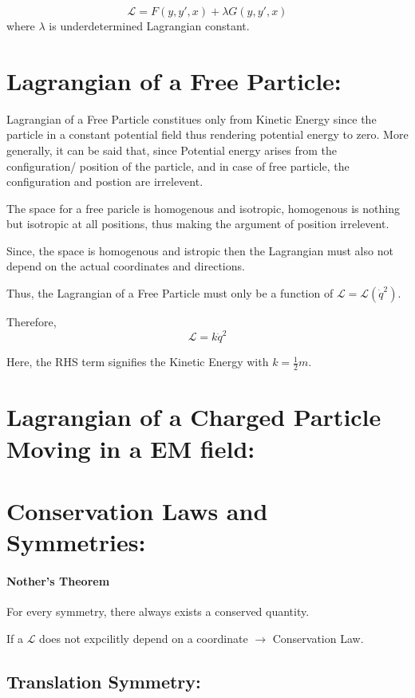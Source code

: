 \documentclass[a4paper]{article}
\newcommand{\Lagr}{\mathcal{L}}
\newcommand{\half}{\frac{1}{2}}
\begin{document}
		$$ \Lagr = F(y, y', x) + \lambda G(y, y', x) $$ where $\lambda$ is underdetermined Lagrangian constant.
	
	\section*{Lagrangian of a Free Particle: }

		Lagrangian of a Free Particle constitues only from Kinetic Energy since the particle in a constant potential field thus rendering potential energy to zero. 
		More generally, it can be said that, since Potential energy arises from the configuration/ position of the particle, and in case of free particle, the configuration and postion are irrelevent.

		The space for a free paricle is homogenous and isotropic, homogenous is nothing but isotropic at all positions, thus making the argument of position irrelevent.

		Since, the space is homogenous and istropic then the Lagrangian must also not depend on the actual coordinates and directions.

		Thus, the Lagrangian of a Free Particle must only be a function of $\Lagr = \Lagr(\dot{q}^2)$.

		Therefore, 
			$$ \Lagr = k \dot{q}^2 $$
		
		Here, the RHS term signifies the Kinetic Energy with $k=\half m$.

	\section*{Lagrangian of a Charged Particle Moving in a EM field: }


	\section*{Conservation Laws and Symmetries: }

		\noindent

		\paragraph*{Nother's Theorem}
			For every symmetry, there always exists a conserved quantity.
		
		If a $\Lagr$ does not expcilitly depend on a coordinate $\rightarrow$ Conservation Law.

		\subsection*{Translation Symmetry: }
\end{document}
